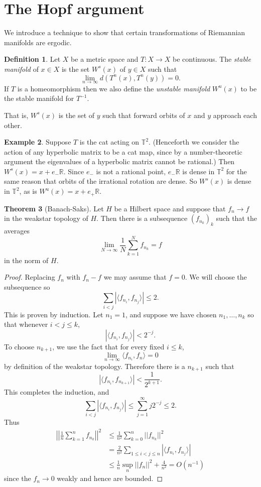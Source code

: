 \documentclass[12pt]{report}
\newcommand{\RR}{\mathbb{R}}
\newcommand{\TT}{\mathbb{T}}
\newcommand{\dfn}[1]{\emph{#1}\index{#1}}
\theoremstyle{definition}
\newtheorem{theorem}{Theorem}[chapter]
\newtheorem{definition}[theorem]{Definition}
\newtheorem{example}[theorem]{Example}
\begin{document}
\section{The Hopf argument}
We introduce a technique to show that certain transformations of Riemannian manifolds are ergodic.
\begin{definition}
Let $X$ be a metric space and $T: X \to X$ be continuous. The \dfn{stable manifold} of $x \in X$ is the set $W^s(x)$ of $y \in X$ such that
$$\lim_{n \to \infty} d(T^n(x), T^n(y)) = 0.$$
If $T$ is a homeomorphism then we also define the \dfn{unstable manifold} $W^u(x)$ to be the stable manifold for $T^{-1}$.
\end{definition}
That is, $W^s(x)$ is the set of $y$ such that forward orbits of $x$ and $y$ approach each other.
\begin{example}
Suppose $T$ is the cat acting on $\TT^2$. (Henceforth we consider the action of any hyperbolic matrix to be a cat map, since by a number-theoretic argument the eigenvalues of a hyperbolic matrix cannot be rational.) Then $W^s(x) = x + e_-\RR$. Since $e_-$ is not a rational point, $e_-\RR$ is dense in $\TT^2$ for the same reason that orbits of the irrational rotation are dense. So $W^s(x)$ is dense in $\TT^2$, as is $W^u(x) = x + e_+\RR$.
\end{example}
\begin{theorem}[Banach-Saks]
Let $H$ be a Hilbert space and suppose that $f_n \to f$ in the weakstar topology of $H$. Then there is a subsequence $(f_{n_k})_k$ such that the averages
$$\lim_{N \to \infty} \frac{1}{N}\sum_{k=1}^N f_{n_k} = f$$
in the norm of $H$.
\end{theorem}
\begin{proof}
Replacing $f_n$ with $f_n - f$ we may assume that $f = 0$. We will choose the subsequence so
$$\sum_{i<j} |\langle f_{n_i}, f_{n_j}\rangle| \leq 2.$$
This is proven by induction. Let $n_1 = 1$, and suppose we have chosen $n_1, \dots, n_k$ so that whenever $i < j \leq k$,
$$|\langle f_{n_i}, f_{n_j}\rangle| < 2^{-j}.$$
To choose $n_{k+1}$, we use the fact that for every fixed $i \leq k$,
$$\lim_{n \to \infty} \langle f_{n_i}, f_n\rangle = 0$$
by definition of the weakstar topology. Therefore there is a $n_{k+1}$ such that
$$|\langle f_{n_i}, f_{n_{k+1}}\rangle| < \frac{1}{2^{k+1}}.$$
This completes the induction, and
$$\sum_{i<j} |\langle f_{n_i}, f_{n_j}\rangle| \leq \sum_{j=1}^\infty j2^{-j} \leq 2.$$
Thus
\begin{align*}\left|\left|\frac{1}{n} \sum_{k=1}^n f_{n_k}\right|\right|^2 &\leq \frac{1}{n^2} \sum_{k=0}^n ||f_{n_k}||^2
\\&= \frac{2}{n^2} \sum_{1 \leq i < j \leq n} |\langle f_{n_i}, f_{n_j}\rangle|
\\&\leq \frac{1}{n} \sup_n ||f_n||^2 + \frac{4}{n^2} = O(n^{-1})
\end{align*}
since the $f_n \to 0$ weakly and hence are bounded.
\end{proof}
\end{document}
